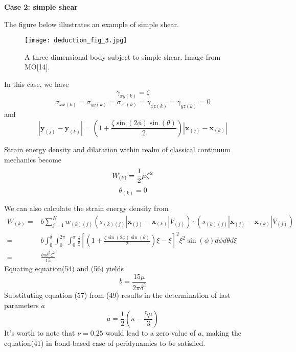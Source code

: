 \documentclass[a4paper,11pt,CJK]{paper}
\newcommand{\bfxj}{\textbf{x}_{(j)}}
\newcommand{\bfyj}{\textbf{y}_{(j)}}
\newcommand{\bfxk}{\textbf{x}_{(k)}}
\newcommand{\bfyk}{\textbf{y}_{(k)}}
\newcommand{\wkj}{w_{(k)(j)}}
\newcommand{\skj}{s_{(k)(j)}}
\newcommand{\thetak}{\theta_{(k)}}
\begin{document}
\textbf{Case 2: simple shear}

The figure below illustrates an example of simple shear.
\begin{figure}[!h]
\center
\texttt{[image: deduction\_fig\_3.jpg]}
\caption{A three dimensional body subject to simple shear. Image from MO[14].}
\end{figure}

In this case, we have
\begin{equation}
\gamma_{xy(k)} = \zeta
\end{equation}
\begin{equation}
\sigma_{xx(k)} = \sigma_{yy(k)} = \sigma_{zz(k)} = \gamma_{xz(k)} =\gamma_{yz(k)} = 0
\end{equation}
and
\begin{equation}
|\bfyj - \bfyk| = (1+\frac{\zeta\sin(2\phi)\sin(\theta)}{2})|\bfxj - \bfxk|
\end{equation}

Strain energy density and dilatation within realm of classical continuum mechanics become
\begin{equation}
W_{(k)} = \frac{1}{2}\mu\zeta^2\\
\end{equation}
\begin{equation}
\thetak = 0
\end{equation}

We can also calculate the strain energy density from
\begin{equation}
\begin{aligned}
W_{(k)} =& b\sum_{j=1}^{N}\wkj(\skj|\bfxj-\bfxk|V_{(j)})\cdot(\skj|\bfxj-\bfxk|V_{(j)})\\
        =& b\int_0^\delta\int_0^{2\pi}\int_0^{\pi}\frac{\delta}{\xi}\left[(1+\frac{\zeta\sin(2\phi)\sin(\theta)}{2})\xi-\xi\right]^2\xi^2\sin(\phi)d\phi d\theta d\xi\\
        =& \frac{b\pi\delta^5\zeta^2}{15}
\end{aligned}
\end{equation}
Equating equation(54) and (56) yields
\begin{equation}
b = \frac{15\mu}{2\pi\delta^5}
\end{equation}
Substituting equation (57) from (49) results in the determination of last parameters $a$
\begin{equation}
a = \frac{1}{2}(\kappa - \frac{5\mu}{3})
\end{equation}
It's worth to note that $\nu=0.25$ would lead to a zero value of $a$, making the equation(41) in bond-based case of peridynamics to be satisfied.
\end{document}

